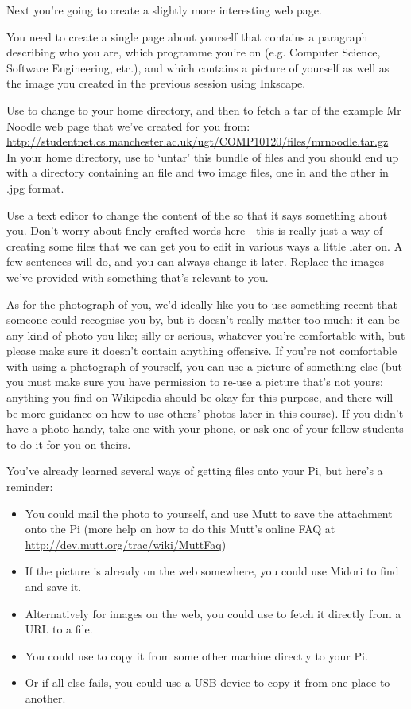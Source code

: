Next you're going to create a slightly more interesting web page. 

You need to create a single page about yourself that contains a paragraph describing who you are, which programme you're on (e.g. Computer Science, Software Engineering, etc.), and which contains a picture of yourself as well as the image you created in the previous session using Inkscape.

Use  to change to your home directory, and then  to fetch a tar of the example Mr Noodle web page that we've created for you from:
\\
\url{http://studentnet.cs.manchester.ac.uk/ugt/COMP10120/files/mrnoodle.tar.gz} 
\\
In your home directory, use  to `untar' this bundle of files and you should end up with a  directory containing an  file and two image files, one in  and the other in {.jpg} format. 


Use a text editor to change the content of the  so that it says something about you. Don't worry about finely crafted words here---this is really just a way of creating some files that we can get you to edit in various ways a little later on. A few sentences will do, and you can always change it later. Replace the images we've provided with something that's relevant to you. 

As for the photograph of you, we'd ideally like you to use something recent that someone could recognise you by, but it doesn't really matter too much: it can be any kind of photo you like; silly or serious, whatever you're comfortable with, but please make sure it doesn't contain anything offensive. If you're not comfortable with using a photograph of yourself, you can use a picture of something else (but you must make sure you have permission to re-use a picture that's not yours; anything you find on Wikipedia should be okay for this purpose, and there will be more guidance on how to use others' photos later in this course). If you didn't have a photo handy, take one with your phone, or ask one of your fellow students to do it for you on theirs.

You've already learned several ways of getting files onto your Pi, but here's a reminder:
\begin{itemize}
\item You could mail the photo to yourself, and use Mutt to save the attachment onto the Pi (more help on how to do this Mutt's online FAQ at \url{http://dev.mutt.org/trac/wiki/MuttFaq})
\item If the picture is already on the web somewhere, you could use Midori to find and save it. 
\item Alternatively for images on the web, you could use  to fetch it directly from a URL to a file. 
\item You could use  to copy it from some other machine directly to your Pi. 
\item Or if all else fails, you could use a USB device to copy it from one place to another. 
\end{itemize}


